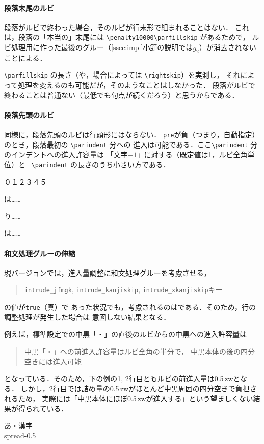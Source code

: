 \documentclass[a4paper,10ptj]{ltjsarticle}
\def\emph#1{\textbf{\textgt{#1}}}
\begin{document}
\paragraph{段落末尾のルビ}
段落がルビで終わった場合，そのルビが行末形で組まれることはない．
これは，段落の「本当の」末尾には \verb+\penalty10000\parfillskip+ があるためで，
ルビ処理用に作った最後のグルー（\ref{ssec:impl}\nobreak 小節の説明では$g_2$）が消去されないことによる．

\verb+\parfillskip+ の長さ（や，場合によっては \verb+\rightskip+）を実測し，
それによって処理を変えるのも可能だが，そのようなことはしなかった．
段落がルビで終わることは普通ない（最低でも句点が続くだろう）と思うからである．

\paragraph{段落先頭のルビ}
同様に，段落先頭のルビは行頭形にはならない．
\texttt{pre}が負（つまり，自動指定）のとき，段落最初の \verb+\parindent+ 分への
進入は可能である．ここ\verb+\parindent+ 分のインデントへの\underline{進入許容量}は
「文字$-1$」に対する（既定値は1，ルビ全角単位）と
\ \verb+\parindent+ の長さのうち小さい方である．
\begin{LTXexample}[preset=\Large,width=0.4\textwidth]
\zw\noindent ０１２３４５\par
{}は……\par
{}り……\par
{}\zw{}は……
\end{LTXexample}

\paragraph{和文処理グルーの伸縮}
現バージョンでは，進入量調整に和文処理グルーを考慮させる，
\begin{quote}
\texttt{intrude\_jfmgk}, \texttt{intrude\_kanjiskip}, \texttt{intrude\_xkanjiskip}キー
\end{quote}
の値が\texttt{true}（真）で
あった状況でも，考慮されるのは\emph{自然長の値のみ}である．そのため，行の調整処理が発生した場合は
意図しない結果となる．

例えば，標準設定での中黒「・」の直後のルビからの中黒への進入許容量は
\begin{quote}
  中黒「・」への\underline{前進入許容量}はルビ全角の半分で，
  中黒本体の後の四分空きには進入可能
\end{quote}
となっている．そのため，下の例の1, 2行目ともルビの前進入量は0.5\,zwとなる．
しかし，2行目では詰め量の0.5\,zwがほとんど中黒周囲の四分空きで負担されるため，
実際には「中黒本体にほぼ0.5\,zwが進入する」という望ましくない結果が得られている．
\begin{LTXexample}[preset=\Large,width=0.4\textwidth]
\leavevmode\hbox{あ・漢字}\\
\hbox spread-0.5
\end{LTXexample}
\end{document}
